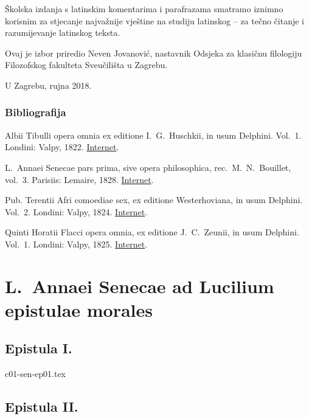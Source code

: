 \documentclass[a4paper,12pt,twoside]{report}
\begin{document}
Školska izdanja s latinskim komentarima i parafrazama smatramo iznimno korisnim za stjecanje najvažnije vještine na studiju latinskog – za tečno čitanje i razumijevanje latinskog teksta.

Ovaj je izbor priredio Neven Jovanović, nastavnik Odsjeka za klasičnu filologiju Filozofskog fakulteta Sveučilišta u Zagrebu.



\medskip

U Zagrebu, rujna 2018.

\section*{Bibliografija}

{
\setlength{\parindent}{0pt}

Albii Tibulli opera omnia ex editione I.\ G.\ Huschkii, in usum Delphini. Vol.\ 1. Londini: Valpy, 1822. \href{https://archive.org/details/delphinclassics173valp}{Internet}.

L.\ Annaei Senecae pars prima, sive opera philosophica, rec.\ M.\ N.\ Bouillet, vol.\ 3. Parisiis: Lemaire, 1828. \href{https://archive.org/details/lannsenecparspr03bouigoog}{Internet}.

Pub. Terentii Afri comoediae sex, ex editione Westerhoviana, in usum Delphini. Vol.\ 2. Londini: Valpy, 1824. \href{https://archive.org/details/pubterentiiafric02tereuoft}{Internet}.

Quinti Horatii Flacci opera omnia, ex editione J.\ C.\ Zeunii, in usum Delphini. Vol.\ 1.  Londini: Valpy, 1825. \href{https://archive.org/details/delphinclassics57valp}{Internet}.

}


\part{L.\ Annaei Senecae ad Lucilium epistulae morales}

\chapter{Epistula I.}

{c01-sen-ep01.tex}

\chapter{Epistula II.}
\end{document}
